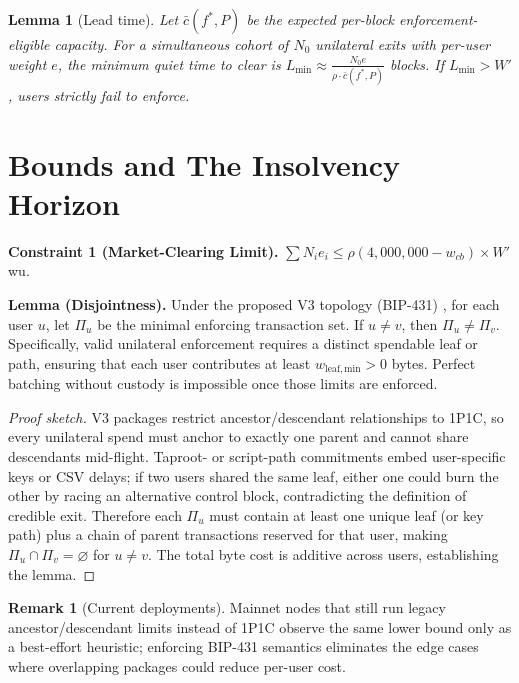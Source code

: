 \documentclass{article}
\newtheorem{lemma}{Lemma}
\theoremstyle{definition}
\newtheorem{remark}{Remark}
\begin{document}
\begin{lemma}[Lead time]
Let $\bar c(f^*,P)$ be the expected per-block enforcement-eligible capacity. For a simultaneous cohort of $N_0$ unilateral exits with per-user weight $e$, the minimum quiet time to clear is $L_{\min} \approx \frac{N_0 e}{\rho \cdot \bar c(f^*,P)}$ blocks. If $L_{\min} > W'$, users strictly fail to enforce.
\end{lemma}

\section{Bounds and The Insolvency Horizon}
\noindent\textbf{Constraint 1 (Market-Clearing Limit).} $\sum N_i e_i \leq \rho (4{,}000{,}000 - w_{cb}) \times W'$ wu.

\medskip
\noindent\textbf{Lemma (Disjointness).}\label{lem:disjointness} Under the proposed V3 topology (BIP-431) \cite{bip431}, for each user $u$, let $\Pi_u$ be the minimal enforcing transaction set. If $u \ne v$, then $\Pi_u \ne \Pi_v$. Specifically, valid unilateral enforcement requires a distinct spendable leaf or path, ensuring that each user contributes at least $w_{\mathrm{leaf,min}} > 0$ bytes. Perfect batching without custody is impossible once those limits are enforced.

\begin{proof}[Proof sketch]
V3 packages restrict ancestor/descendant relationships to 1P1C, so every unilateral spend must anchor to exactly one parent and cannot share descendants mid-flight. Taproot- or script-path commitments embed user-specific keys or CSV delays; if two users shared the same leaf, either one could burn the other by racing an alternative control block, contradicting the definition of credible exit. Therefore each $\Pi_u$ must contain at least one unique leaf (or key path) plus a chain of parent transactions reserved for that user, making $\Pi_u \cap \Pi_v = \varnothing$ for $u \ne v$. The total byte cost is additive across users, establishing the lemma.
\end{proof}

\begin{remark}[Current deployments]
Mainnet nodes that still run legacy ancestor/descendant limits instead of 1P1C observe the same lower bound only as a best-effort heuristic; enforcing BIP-431 semantics eliminates the edge cases where overlapping packages could reduce per-user cost.
\end{remark}
\end{document}
